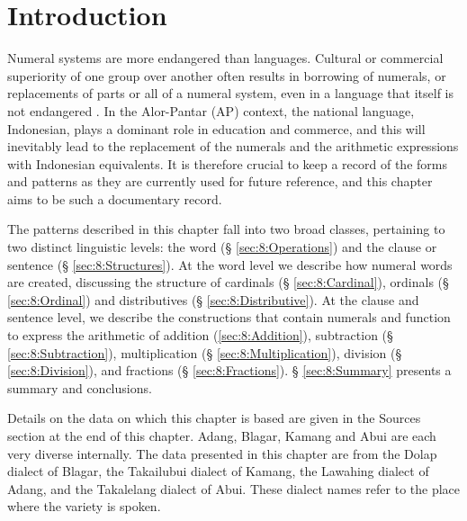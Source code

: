 
\section{Introduction}
\label{sec:8:Introduction}
\hypertarget{Toc376958929}{}Numeral systems are more endangered than languages. Cultural or commercial superiority of one group over another often results in borrowing of numerals, or replacements of parts or all of a numeral system, even in a language that itself is not endangered \citep{Comrie2005numsys}. In the Alor-Pantar (AP) context, the national language, Indonesian, plays a dominant role in education and commerce, and this will inevitably lead to the replacement of the numerals and the arithmetic expressions with Indonesian equivalents. It is therefore crucial to keep a record of the forms and patterns as they are currently used for future reference, and this chapter aims to be such a documentary record. 


The patterns described in this chapter fall into two broad classes, pertaining to two distinct linguistic levels: the word ({\S} \ref{sec:8:Operations}) and the clause or sentence ({\S} \ref{sec:8:Structures}). At the word level we describe how numeral words are created, discussing the structure of cardinals ({\S} \ref{sec:8:Cardinal}), ordinals ({\S} \ref{sec:8:Ordinal}) and distributives ({\S} \ref{sec:8:Distributive}). At the clause and sentence level, we describe the constructions that contain numerals and function to express the arithmetic of addition (\ref{sec:8:Addition}), subtraction ({\S} \ref{sec:8:Subtraction}), multiplication ({\S} \ref{sec:8:Multiplication}), division ({\S} \ref{sec:8:Division}), and fractions ({\S} \ref{sec:8:Fractions}). {\S} \ref{sec:8:Summary} presents a summary and conclusions. 

Details on the data on which this chapter is based are given in the  Sources section at the end of this chapter. Adang, Blagar, Kamang and Abui are each very diverse internally. The data presented in this chapter are from the Dolap dialect of Blagar, the Takailubui dialect of Kamang, the Lawahing dialect of Adang, and the Takalelang dialect of Abui. These dialect names refer to the place where the variety is spoken.


